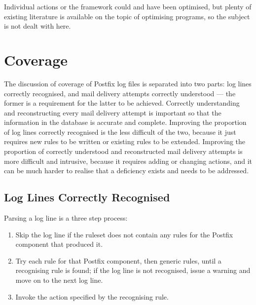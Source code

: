 Individual actions or the framework could and have been optimised, but
plenty of existing literature is available on the topic of optimising
programs, so the subject is not dealt with here.



\FloatBarrier{}

\section{Coverage}

\label{parsing coverage}

The discussion of \parsernames{} coverage of Postfix log files is separated
into two parts: log lines correctly recognised, and mail delivery attempts
correctly understood --- the former is a requirement for the latter to be
achieved.  Correctly understanding and reconstructing every mail delivery
attempt is important so that the information in the database is accurate and
complete.  Improving the proportion of log lines correctly recognised is
the less difficult of the two, because it just requires new rules to be
written or existing rules to be extended.  Improving the proportion of
correctly understood and reconstructed mail delivery attempts is more
difficult and intrusive, because it requires adding or changing actions,
and it can be much harder to realise that a deficiency exists and needs to
be addressed.

\subsection{Log Lines Correctly Recognised}

\label{log-lines-covered}

Parsing a log line is a three step process:

\begin{enumerate}

    \squeezeitems{}

    \item Skip the log line if the ruleset does not contain any rules for
        the Postfix component that produced it.

    \item Try each rule for that Postfix component, then generic rules,
        until a recognising rule is found; if the log line is not
        recognised, issue a warning and move on to the next log line.

    \item Invoke the action specified by the recognising rule.

\end{enumerate}

